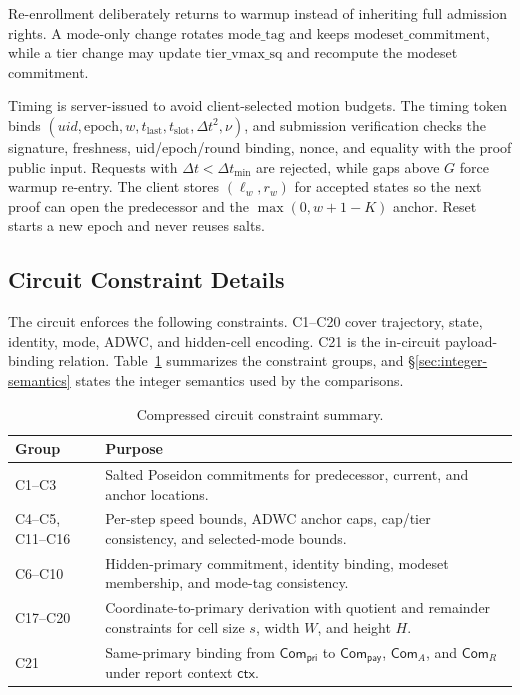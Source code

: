 \documentclass[journal]{IEEEtran}
\theoremstyle{definition}
\theoremstyle{plain}
\begin{document}
Re-enrollment deliberately returns to warmup instead of inheriting full
admission rights. A mode-only change rotates \(\mathrm{mode\_tag}\) and keeps
\(\mathrm{modeset\_commitment}\), while a tier change may update
\(\mathrm{tier\_vmax\_sq}\) and recompute the modeset commitment.

Timing is server-issued to avoid client-selected motion budgets. The timing
token binds
\((uid,\mathrm{epoch},w,t_{\mathrm{last}},t_{\mathrm{slot}},\Delta t^2,\nu)\),
and submission verification checks the signature, freshness, uid/epoch/round
binding, nonce, and equality with the proof public input. Requests with
\(\Delta t<\Delta t_{\min}\) are rejected, while gaps above \(G\) force warmup
re-entry. The client stores \((\ell_w,r_w)\) for accepted states so the next
proof can open the predecessor and the \(\max(0,w+1-K)\) anchor. Reset starts a
new epoch and never reuses salts.

\subsection{Circuit Constraint Details}
\label{sec:circuit-constraints}

The circuit enforces the following constraints. C1--C20 cover trajectory,
state, identity, mode, ADWC, and hidden-cell encoding. C21 is the in-circuit
payload-binding relation. Table~\ref{tab:constraint-summary} summarizes the
constraint groups, and \S\ref{sec:integer-semantics} states the integer
semantics used by the comparisons.

\begin{table}[ht]
  \centering
  \caption{Compressed circuit constraint summary.}
  \label{tab:constraint-summary}
  \scriptsize
  \setlength{\tabcolsep}{3pt}
  \begin{tabularx}{\columnwidth}{@{}p{1.45cm} X@{}}
      \toprule
      \textbf{Group} & \textbf{Purpose} \\
      \midrule
      C1--C3 & Salted Poseidon commitments for predecessor, current, and anchor locations. \\
      C4--C5, C11--C16 & Per-step speed bounds, ADWC anchor caps, cap/tier consistency, and selected-mode bounds. \\
      C6--C10 & Hidden-primary commitment, identity binding, modeset membership, and mode-tag consistency. \\
      C17--C20 & Coordinate-to-primary derivation with quotient and remainder constraints for cell size \(s\), width \(W\), and height \(H\). \\
      C21 & Same-primary binding from \(\mathsf{Com}_{\mathsf{pri}}\) to \(\mathsf{Com}_{\mathsf{pay}}\), \(\mathsf{Com}_{A}\), and \(\mathsf{Com}_{R}\) under report context \(\mathsf{ctx}\). \\
      \bottomrule
  \end{tabularx}
\end{table}
\end{document}
